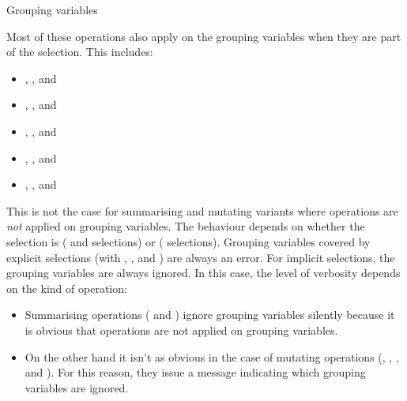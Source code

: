 \documentclass[a4paper]{book}
\begin{document}
\begin{Section}{Grouping variables}


Most of these operations also apply on the grouping variables when
they are part of the selection. This includes:
\begin{itemize}

\item{} , , and 
\item{} , , and 
\item{} , , and 
\item{} , , and 
\item{} , , and 

\end{itemize}


This is not the case for summarising and mutating variants where
operations are \emph{not} applied on grouping variables. The behaviour
depends on whether the selection is  ( and 
selections) or  ( selections). Grouping variables
covered by explicit selections (with ,
, and ) are always an error. For
implicit selections, the grouping variables are always ignored. In
this case, the level of verbosity depends on the kind of operation:
\begin{itemize}

\item{} Summarising operations ( and )
ignore grouping variables silently because it is obvious that
operations are not applied on grouping variables.
\item{} On the other hand it isn't as obvious in the case of mutating
operations (, , , and
). For this reason, they issue a message
indicating which grouping variables are ignored.

\end{itemize}

\end{Section}
\end{document}
